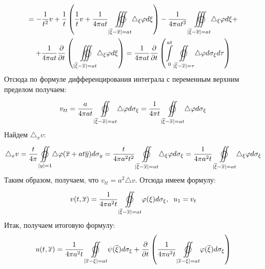\begin{Proof}
$$\begin{gathered}
		= -\frac{1}{t^2}v + \frac{1}{t}\left( \frac{1}{t}v + \frac{1}{4\pi at}\underset{|\overline{\xi} - \overline{x}|=at}{\overset{}{\varoiint \hspace{-19.3pt} \int}}\triangle_{\xi}\varphi d \xi \right) - \frac{1}{4\pi at^2}\underset{|\overline{\xi} - \overline{x}|=at}{\overset{}{\varoiint \hspace{-19.3pt} \int}}\triangle_{\xi}\varphi d \xi + \\
		+ \frac{1}{4\pi at}\frac{\partial}{\partial t}\left( \underset{|\overline{\xi} - \overline{x}|=at}{\overset{}{\varoiint \hspace{-19.3pt} \int}}\triangle_{\xi}\varphi d \xi \right) = \frac{1}{4\pi at}\frac{\partial}{\partial t}\left( \underset{0}{\overset{at}{\int}}\underset{|\overline{\xi} - \overline{x}|=\tau}{\overset{}{\varoiint}}\triangle\varphi d \sigma_{\xi}d\tau \right)
	\end{gathered}$$
	Отсюда по формуле дифференцирования интеграла с переменным верхним пределом получаем:
	$$v_{tt} = \frac{a}{4\pi at}\underset{|\overline{\xi} - \overline{x}|=at}{\overset{}{\varoiint}}\triangle\varphi d \sigma_{\xi} = \frac{1}{4\pi t}\underset{|\overline{\xi} - \overline{x}|=at}{\overset{}{\varoiint}}\triangle\varphi d \sigma_{\xi}$$
	Найдем $\triangle_x v$:
	$$\begin{gathered}
		\triangle_x v = \frac{t}{4 \pi} \underset{|y| = 1}{\overset{}{\varoiint}} \triangle \varphi (\overline{x} + at\overline{y}) d\sigma_y = \frac{t}{4 \pi a^2 t^2} \underset{|\overline{\xi} - \overline{x}|=at}{\overset{}{\varoiint}} \triangle_{\xi}\varphi d\sigma_{\xi} = \frac{1}{4 \pi a^2 t} \underset{|\overline{\xi} - \overline{x}|=at}{\overset{}{\varoiint}} \triangle_{\xi}\varphi d\sigma_{\xi}
	\end{gathered}$$
	Таким образом, получаем, что $v_{tt} = a^2 \triangle v$. Отсюда имеем формулу:
	$$v (t, \overline{x}) = \frac{1}{4 \pi a^2 t} \underset{| \overline{\xi} - \overline{x}| = at}{\overset{}{\varoiint}} \varphi(\xi) d \sigma_{\xi}, \;\; u_1 = v_t$$
	Итак, получаем итоговую формулу:
	$$u(t, \overline{x}) = \frac{1}{4 \pi a^2 t} \underset{|\overline{x} - \xi| = at}{\overset{}{\varoiint}} \psi (\overline{\xi}) d \sigma_\xi + \frac{\partial}{\partial t} \left(\frac{1}{4 \pi a^2 t} \underset{|\overline{x} - \xi| = at}{\overset{}{\varoiint}} \varphi (\overline{\xi}) d \sigma_\xi \right)$$
\end{Proof}



























